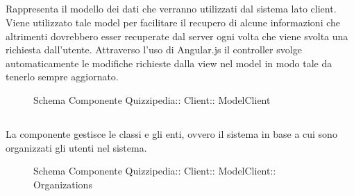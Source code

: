 \subsection{}
Rappresenta il modello dei dati che verranno utilizzati dal sistema lato client. Viene utilizzato tale model per facilitare il recupero di alcune informazioni che altrimenti dovrebbero esser recuperate dal server ogni volta che viene svolta una richiesta dall'utente.
Attraverso l'uso di Angular.js il controller svolge automaticamente le modifiche richieste dalla view nel model in modo tale da tenerlo sempre aggiornato.
\begin{figure}[H]
\centering
\noindent{}
\caption[Schema Componente ModelClient]{Schema Componente Quizzipedia:: Client:: ModelClient}
\end{figure}
\subsection{}
La componente gestisce le classi e gli enti, ovvero il sistema in base a cui sono organizzati gli utenti nel sistema.
\begin{figure}[H]
\centering
\noindent{}
\caption[Schema Componente Organizations]{Schema Componente Quizzipedia:: Client:: ModelClient:: Organizations}
\end{figure}
